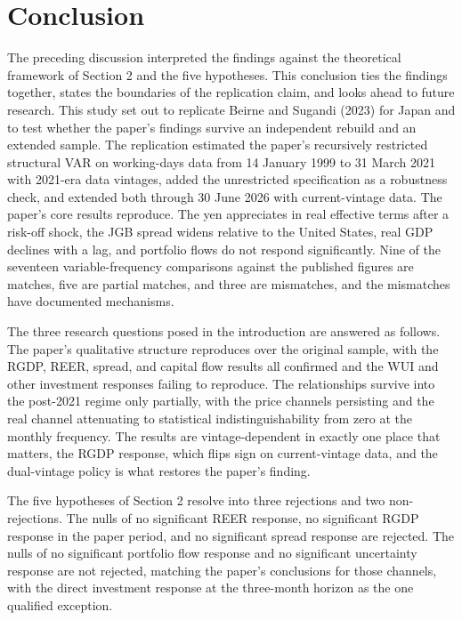 \section{Conclusion}

The preceding discussion interpreted the findings against the theoretical framework of Section 2 and the five hypotheses. This conclusion ties the findings together, states the boundaries of the replication claim, and looks ahead to future research. This study set out to replicate Beirne and Sugandi (2023) for Japan and to test whether the paper's findings survive an independent rebuild and an extended sample. The replication estimated the paper's recursively restricted structural VAR on working-days data from 14 January 1999 to 31 March 2021 with 2021-era data vintages, added the unrestricted specification as a robustness check, and extended both through 30 June 2026 with current-vintage data. The paper's core results reproduce. The yen appreciates in real effective terms after a risk-off shock, the JGB spread widens relative to the United States, real GDP declines with a lag, and portfolio flows do not respond significantly. Nine of the seventeen variable-frequency comparisons against the published figures are matches, five are partial matches, and three are mismatches, and the mismatches have documented mechanisms.

The three research questions posed in the introduction are answered as follows. The paper's qualitative structure reproduces over the original sample, with the RGDP, REER, spread, and capital flow results all confirmed and the WUI and other investment responses failing to reproduce. The relationships survive into the post-2021 regime only partially, with the price channels persisting and the real channel attenuating to statistical indistinguishability from zero at the monthly frequency. The results are vintage-dependent in exactly one place that matters, the RGDP response, which flips sign on current-vintage data, and the dual-vintage policy is what restores the paper's finding.

The five hypotheses of Section 2 resolve into three rejections and two non-rejections. The nulls of no significant REER response, no significant RGDP response in the paper period, and no significant spread response are rejected. The nulls of no significant portfolio flow response and no significant uncertainty response are not rejected, matching the paper's conclusions for those channels, with the direct investment response at the three-month horizon as the one qualified exception.

